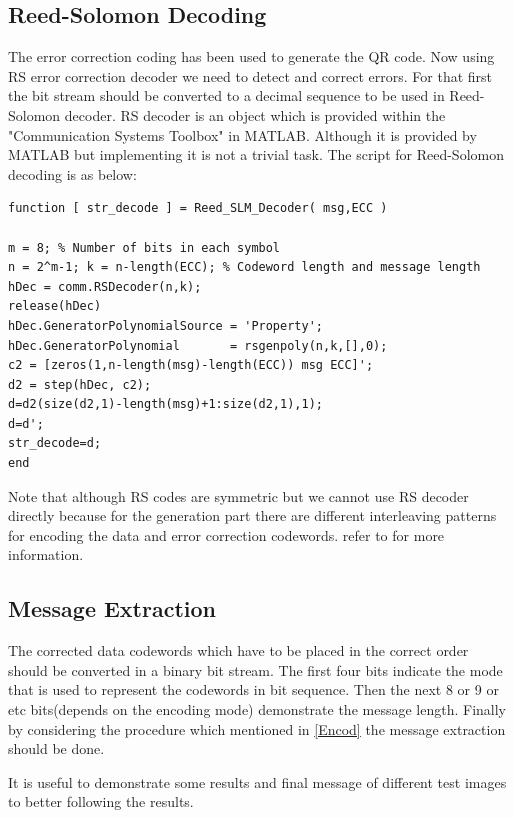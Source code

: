 \subsection{Reed-Solomon Decoding}

The error correction coding has been used to generate the QR code. Now using RS error correction decoder we need to detect and correct errors. For that first the bit stream should be converted to a decimal sequence to be used in Reed-Solomon decoder. RS decoder is an object which is provided within the "Communication Systems Toolbox" in MATLAB. Although it is provided by MATLAB but implementing it is not a trivial task. The script for Reed-Solomon decoding is as below:
\begin{lstlisting}
function [ str_decode ] = Reed_SLM_Decoder( msg,ECC )

m = 8; % Number of bits in each symbol
n = 2^m-1; k = n-length(ECC); % Codeword length and message length
hDec = comm.RSDecoder(n,k);
release(hDec)
hDec.GeneratorPolynomialSource = 'Property';
hDec.GeneratorPolynomial       = rsgenpoly(n,k,[],0);
c2 = [zeros(1,n-length(msg)-length(ECC)) msg ECC]';
d2 = step(hDec, c2);
d=d2(size(d2,1)-length(msg)+1:size(d2,1),1);
d=d';
str_decode=d;
end
\end{lstlisting}

Note that although RS codes are symmetric but we cannot use RS decoder directly because for the generation part there are different interleaving patterns for encoding the data and error correction codewords. refer to \cite{1iso} for more information.

\subsection{Message Extraction}

The corrected data codewords which have to be placed in the correct order should be converted in a binary bit stream. The first four bits indicate the mode that is used to
represent the codewords in bit sequence. Then the next 8 or 9 or  etc bits(depends on the encoding mode) demonstrate the message length. Finally by considering the procedure which mentioned in \ref{Encod} the message extraction should be done.

It is useful to demonstrate some results and final message of different test images to better following the results.


